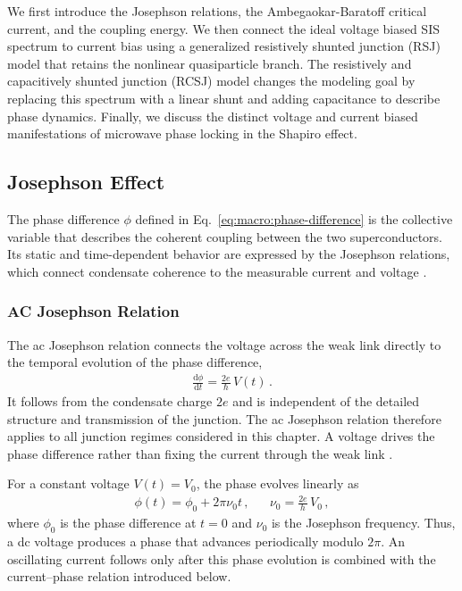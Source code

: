     We first introduce the Josephson relations, the Ambegaokar-Baratoff critical current, and the coupling energy. We then connect the ideal voltage biased SIS spectrum to current bias using a generalized resistively shunted junction (RSJ) model that retains the nonlinear quasiparticle branch. The resistively and capacitively shunted junction (RCSJ) model changes the modeling goal by replacing this spectrum with a linear shunt and adding capacitance to describe phase dynamics. Finally, we discuss the distinct voltage and current biased manifestations of microwave phase locking in the Shapiro effect.

    \subsection{Josephson Effect}
    \label{subsec:macro:josephson}

        The phase difference $\phi$ defined in Eq.~\eqref{eq:macro:phase-difference} is the collective variable that describes the coherent coupling between the two superconductors. Its static and time-dependent behavior are expressed by the Josephson relations, which connect condensate coherence to the measurable current and voltage \cite{josephson_possible_1962}.

        \subsubsection*{AC Josephson Relation}

            The ac Josephson relation connects the voltage across the weak link directly to the temporal evolution of the phase difference,
            \begin{align}
                \frac{\mathrm{d}\phi}{\mathrm{d}t} = \frac{2e}{\hbar}\,V(t)\,.
                \label{eq:macro:josephson-voltage-phase}
            \end{align}
            It follows from the condensate charge $2e$ and is independent of the detailed structure and transmission of the junction. The ac Josephson relation therefore applies to all junction regimes considered in this chapter. A voltage drives the phase difference rather than fixing the current through the weak link \cite{josephson_possible_1962}.

            For a constant voltage $V(t)=V_0$, the phase evolves linearly as
            \begin{align}
                \phi(t) = \phi_0 + 2\pi \nu_0t\,, &&
                \nu_0 = \frac{2e}{h}\,V_0\,,
                \label{eq:macro:josephson-phase-evolution}
            \end{align}
            where $\phi_0$ is the phase difference at $t=0$ and $\nu_0$ is the Josephson frequency. Thus, a dc voltage produces a phase that advances periodically modulo $2\pi$. An oscillating current follows only after this phase evolution is combined with the current--phase relation introduced below.

